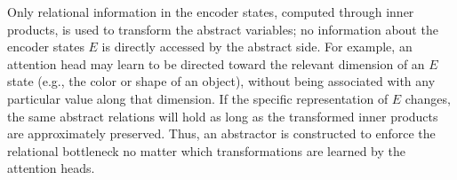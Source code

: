 Only relational information in the encoder states, computed through inner products,
is used to transform the abstract variables; no information about the encoder states $E$ is directly accessed by the abstract side. For example, an attention head may learn to be directed toward the relevant dimension of an $E$ state (e.g., the color or shape of an object), without being associated with any particular value along that dimension. If the specific representation of $E$ changes, the same abstract relations will hold as long as the transformed inner products are approximately preserved. Thus, an abstractor is constructed to enforce the relational bottleneck 
no matter which transformations are learned by the attention heads.


%
%
%
%
%

